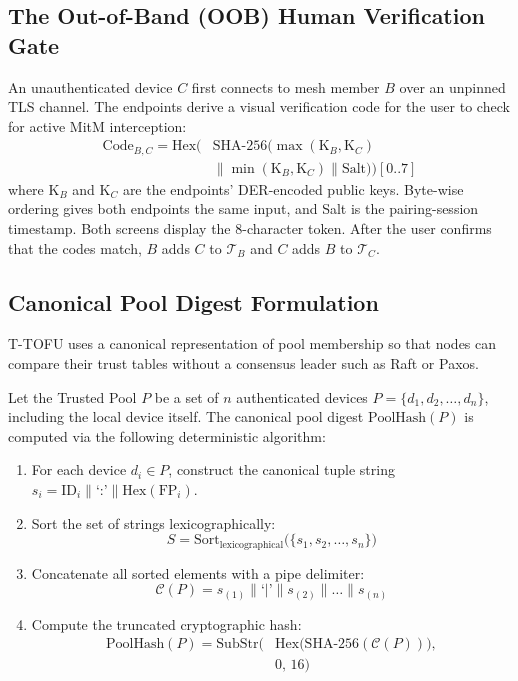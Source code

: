 \documentclass[conference,a4paper]{IEEEtran}
\begin{document}
\subsection{The Out-of-Band (OOB) Human Verification Gate}
An unauthenticated device $C$ first connects to mesh member $B$ over an unpinned TLS channel. The endpoints derive a visual verification code for the user to check for active MitM interception:
\begin{equation}
\begin{split}
    \text{Code}_{B,C} = \text{Hex}\Big(&\text{SHA-256}\big(\max(\text{K}_B, \text{K}_C) \\
    &\parallel \min(\text{K}_B, \text{K}_C) \parallel \text{Salt}\big)\Big)[0..7]
\end{split}
\label{eq:code}
\end{equation}
where $\text{K}_B$ and $\text{K}_C$ are the endpoints' DER-encoded public keys. Byte-wise ordering gives both endpoints the same input, and Salt is the pairing-session timestamp. Both screens display the 8-character token. After the user confirms that the codes match, $B$ adds $C$ to $\mathcal{T}_B$ and $C$ adds $B$ to $\mathcal{T}_C$.

\subsection{Canonical Pool Digest Formulation}
T-TOFU uses a canonical representation of pool membership so that nodes can compare their trust tables without a consensus leader such as Raft or Paxos.

Let the Trusted Pool $P$ be a set of $n$ authenticated devices $P = \{d_1, d_2, \dots, d_n\}$, including the local device itself. The canonical pool digest $\text{PoolHash}(P)$ is computed via the following deterministic algorithm:
\begin{enumerate}
    \item For each device $d_i \in P$, construct the canonical tuple string $s_i = \text{ID}_i \parallel \text{`:'} \parallel \text{Hex}(\text{FP}_i)$.
    \item Sort the set of strings lexicographically:
    \begin{equation}
        S = \text{Sort}_{\text{lexicographical}}\big(\{s_1, s_2, \dots, s_n\}\big)
    \end{equation}
    \item Concatenate all sorted elements with a pipe delimiter:
    \begin{equation}
        \mathcal{C}(P) = s_{(1)} \parallel \text{`}{\vert}\text{'} \parallel s_{(2)} \parallel \dots \parallel s_{(n)}
    \end{equation}
    \item Compute the truncated cryptographic hash:
    \begin{equation}
    \begin{split}
        \text{PoolHash}(P) = \text{SubStr}\Big(&\text{Hex}\big(\text{SHA-256}(\mathcal{C}(P))\big), \\
        &0,\, 16\Big)
    \end{split}
    \end{equation}
\end{enumerate}
\end{document}
